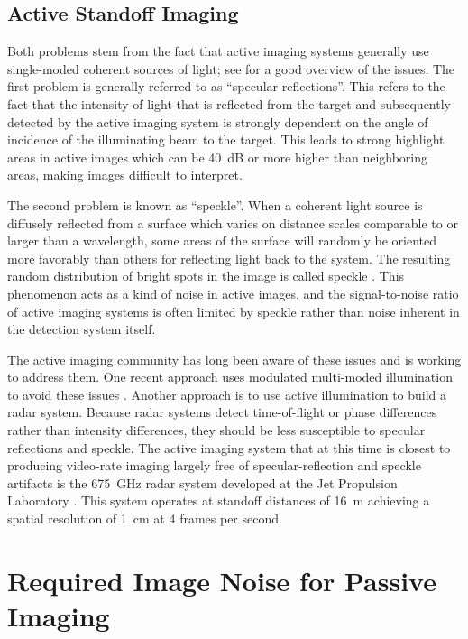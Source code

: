 \subsection{Active Standoff Imaging}

Both problems stem from the fact that active imaging systems generally use single-moded coherent sources of light; see \cite{petkie_active_2008} for a good overview of the issues.
The first problem is generally referred to as ``specular reflections''.
This refers to the fact that the intensity of light that is reflected from the target and subsequently detected by the active imaging system is strongly dependent on the angle of incidence of the illuminating beam to the target.
This leads to strong highlight areas in active images which can be \SI{40}{\dB} or more higher than neighboring areas, making images difficult to interpret.

The second problem is known as ``speckle''.
When a coherent light source is diffusely reflected from a surface which varies on distance scales comparable to or larger than a wavelength, some areas of the surface will randomly be oriented more favorably than others for reflecting light back to the system.
The resulting random distribution of bright spots in the image is called speckle \cite{goodman_fundamental_1976}.
This phenomenon acts as a kind of noise in active images, and the signal-to-noise ratio of active imaging systems is often limited by speckle rather than noise inherent in the detection system itself.

The active imaging community has long been aware of these issues and is working to address them.
One recent approach uses modulated multi-moded illumination to avoid these issues \cite{petkie_multimode_2012,patrick_elimination_2012}.
Another approach is to use active illumination to build a radar system.
Because radar systems detect time-of-flight or phase differences rather than intensity differences, they should be less susceptible to specular reflections and speckle.
The active imaging system that at this time is closest to producing video-rate imaging largely free of specular-reflection and speckle artifacts is the \SI{675}{\GHz} radar system developed at the Jet Propulsion Laboratory \cite{cooper_thz_2011}.
This system operates at standoff distances of \SI{16}{\m} achieving a spatial resolution of \SI{1}{\cm} at 4 frames per second.

\section{Required Image Noise for Passive Imaging} \label{sec:ch1-netd-reqs}

